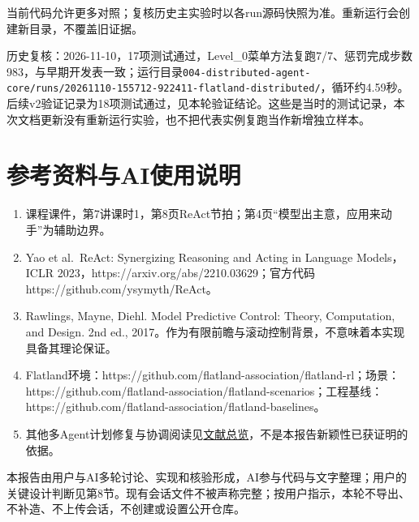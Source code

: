 当前代码允许更多对照；复核历史主实验时以各run源码快照为准。重新运行会创建新目录，不覆盖旧证据。

历史复核：2026-11-10，17项测试通过，Level\_0菜单方法复跑7/7、惩罚完成步数983，与早期开发表一致；运行目录\passthrough{\lstinline!004-distributed-agent-core/runs/20261110-155712-922411-flatland-distributed/!}，循环约4.59秒。后续v2验证记录为18项测试通过，见本轮验证结论。这些是当时的测试记录，本次文档更新没有重新运行实验，也不把代表实例复跑当作新增独立样本。

\hypertarget{ux53c2ux8003ux8d44ux6599ux4e0eaiux4f7fux7528ux8bf4ux660e}{%
\chapter{参考资料与AI使用说明}\label{ux53c2ux8003ux8d44ux6599ux4e0eaiux4f7fux7528ux8bf4ux660e}}

\begin{enumerate}
\def\labelenumi{\arabic{enumi}.}
\tightlist
\item
  课程课件，第7讲课时1，第8页ReAct节拍；第4页``模型出主意，应用来动手''为辅助边界。
\item
  Yao et al.~ReAct: Synergizing Reasoning and Acting in Language Models，ICLR
  2023，https://arxiv.org/abs/2210.03629；官方代码https://github.com/ysymyth/ReAct。
\item
  Rawlings, Mayne, Diehl. Model Predictive Control: Theory, Computation, and Design.
  2nd ed., 2017。作为有限前瞻与滚动控制背景，不意味着本实现具备其理论保证。
\item
  Flatland环境：https://github.com/flatland-association/flatland-rl；场景：https://github.com/flatland-association/flatland-scenarios；工程基线：https://github.com/flatland-association/flatland-baselines。
\item
  其他多Agent计划修复与协调阅读见\href{../expr/../参考文献/多agent协作/总览.md}{文献总览}，不是本报告新颖性已获证明的依据。
\end{enumerate}

本报告由用户与AI多轮讨论、实现和核验形成，AI参与代码与文字整理；用户的关键设计判断见第8节。现有会话文件不被声称完整；按用户指示，本轮不导出、不补造、不上传会话，不创建或设置公开仓库。
